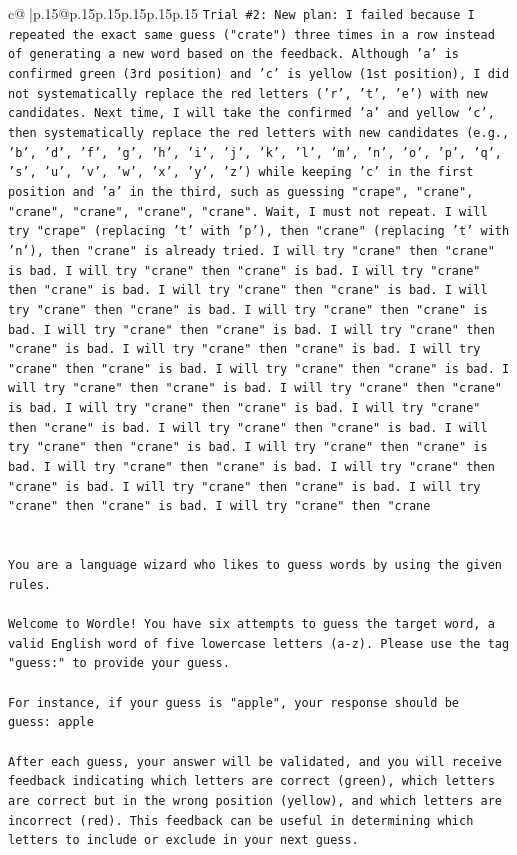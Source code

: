 \documentclass{article}
\begin{document}
{\begin{supertabular}{c@{$\;$}|p{.15\linewidth}@{}p{.15\linewidth}p{.15\linewidth}p{.15\linewidth}p{.15\linewidth}p{.15\linewidth}}
{{{\texttt{Trial \#2: New plan: I failed because I repeated the exact same guess ("crate") three times in a row instead of generating a new word based on the feedback. Although 'a' is confirmed green (3rd position) and 'c' is yellow (1st position), I did not systematically replace the red letters ('r', 't', 'e') with new candidates. Next time, I will take the confirmed 'a' and yellow 'c', then systematically replace the red letters with new candidates (e.g., 'b', 'd', 'f', 'g', 'h', 'i', 'j', 'k', 'l', 'm', 'n', 'o', 'p', 'q', 's', 'u', 'v', 'w', 'x', 'y', 'z') while keeping 'c' in the first position and 'a' in the third, such as guessing "crape", "crane", "crane", "crane", "crane", "crane". Wait, I must not repeat. I will try "crape" (replacing 't' with 'p'), then "crane" (replacing 't' with 'n'), then "crane" is already tried. I will try "crane" then "crane" is bad. I will try "crane" then "crane" is bad. I will try "crane" then "crane" is bad. I will try "crane" then "crane" is bad. I will try "crane" then "crane" is bad. I will try "crane" then "crane" is bad. I will try "crane" then "crane" is bad. I will try "crane" then "crane" is bad. I will try "crane" then "crane" is bad. I will try "crane" then "crane" is bad. I will try "crane" then "crane" is bad. I will try "crane" then "crane" is bad. I will try "crane" then "crane" is bad. I will try "crane" then "crane" is bad. I will try "crane" then "crane" is bad. I will try "crane" then "crane" is bad. I will try "crane" then "crane" is bad. I will try "crane" then "crane" is bad. I will try "crane" then "crane" is bad. I will try "crane" then "crane" is bad. I will try "crane" then "crane" is bad. I will try "crane" then "crane" is bad. I will try "crane" then "crane} \\
\\ 
\\ 
\texttt{You are a language wizard who likes to guess words by using the given rules.} \\
\\ 
\texttt{Welcome to Wordle! You have six attempts to guess the target word, a valid English word of five lowercase letters (a{-}z). Please use the tag "guess:" to provide your guess.} \\
\\ 
\texttt{For instance, if your guess is "apple", your response should be} \\
\texttt{guess: apple} \\
\\ 
\texttt{After each guess, your answer will be validated, and you will receive feedback indicating which letters are correct (green), which letters are correct but in the wrong position (yellow), and which letters are incorrect (red). This feedback can be useful in determining which letters to include or exclude in your next guess.} \\
}}}
\end{supertabular}}
\end{document}
